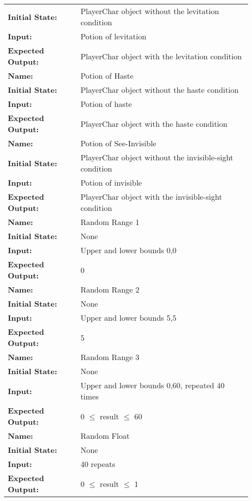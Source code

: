 \documentclass[12pt, titlepage]{article}
\begin{document}
\begin{center}
\begin{longtable}{ l | p{10cm} }
				\textbf{Initial State:} & PlayerChar object without the levitation condition\\
				\textbf{Input:} & Potion of levitation\\
				\textbf{Expected Output:} & PlayerChar object with the levitation condition\\[0.6em]
				\hline
				\rule{0pt}{1.5em}\textbf{Name:} & Potion of Haste\\
				\textbf{Initial State:} & PlayerChar object without the haste condition\\
				\textbf{Input:} & Potion of haste\\
				\textbf{Expected Output:} & PlayerChar object with the haste condition\\[0.6em]
				\hline
				\rule{0pt}{1.5em}\textbf{Name:} & Potion of See-Invisible\\
				\textbf{Initial State:} & PlayerChar object without the invisible-sight condition\\
				\textbf{Input:} & Potion of invisible\\
				\textbf{Expected Output:} & PlayerChar object with the invisible-sight condition\\[0.6em]
				\hline
				\rule{0pt}{1.5em}\textbf{Name:} & Random Range 1\\
				\textbf{Initial State:} & None\\
				\textbf{Input:} & Upper and lower bounds 0,0\\
				\textbf{Expected Output:} & 0\\[0.6em]
				\hline
				\rule{0pt}{1.5em}\textbf{Name:} & Random Range 2\\
				\textbf{Initial State:} & None\\
				\textbf{Input:} & Upper and lower bounds 5,5\\
				\textbf{Expected Output:} & 5\\[0.6em]
				\hline
				\rule{0pt}{1.5em}\textbf{Name:} & Random Range 3\\
				\textbf{Initial State:} & None\\
				\textbf{Input:} & Upper and lower bounds 0,60, repeated 40 times\\
				\textbf{Expected Output:} & 0 $\le$ result $\le$ 60\\[0.6em]
				\hline
				\rule{0pt}{1.5em}\textbf{Name:} & Random Float\\
				\textbf{Initial State:} & None\\
				\textbf{Input:} & 40 repeats\\
				\textbf{Expected Output:} & 0 $\le$ result $\le$ 1\\[0.6em]

\end{longtable}
\end{center}
\end{document}
